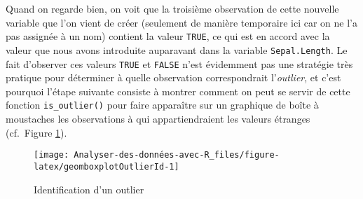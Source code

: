 \documentclass[
  french,
]{book}
\newenvironment{Shaded}{\begin{snugshade}}{\end{snugshade}}
\newcommand{\CommentTok}[1]{\textcolor[rgb]{0.56,0.35,0.01}{\textit{#1}}}
\newcommand{\DataTypeTok}[1]{\textcolor[rgb]{0.13,0.29,0.53}{#1}}
\newcommand{\DecValTok}[1]{\textcolor[rgb]{0.00,0.00,0.81}{#1}}
\newcommand{\KeywordTok}[1]{\textcolor[rgb]{0.13,0.29,0.53}{\textbf{#1}}}
\newcommand{\NormalTok}[1]{#1}
\newcommand{\OperatorTok}[1]{\textcolor[rgb]{0.81,0.36,0.00}{\textbf{#1}}}
\newcommand{\StringTok}[1]{\textcolor[rgb]{0.31,0.60,0.02}{#1}}
\begin{document}
Quand on regarde bien, on voit que la troisième observation de cette nouvelle variable que l'on vient de créer (seulement de manière temporaire ici car on ne l'a pas assignée à un nom) contient la valeur \texttt{TRUE}, ce qui est en accord avec la valeur que nous avons introduite auparavant dans la variable \texttt{Sepal.Length}. Le fait d'observer ces valeurs \texttt{TRUE} et \texttt{FALSE} n'est évidemment pas une stratégie très pratique pour déterminer à quelle observation correspondrait l'\emph{outlier}, et c'est pourquoi l'étape suivante consiste à montrer comment on peut se servir de cette fonction \texttt{is\_outlier()} pour faire apparaître sur un graphique de boîte à moustaches les observations à qui appartiendraient les valeurs étranges (cf.~Figure \ref{fig:geomboxplotOutlierId}).

\begin{Shaded}
\end{Shaded}

\begin{figure}

{\centering \texttt{[image: Analyser-des-données-avec-R\_files/figure-latex/geomboxplotOutlierId-1]} 

}

\caption{Identification d'un outlier}\label{fig:geomboxplotOutlierId}
\end{figure}
\end{document}
